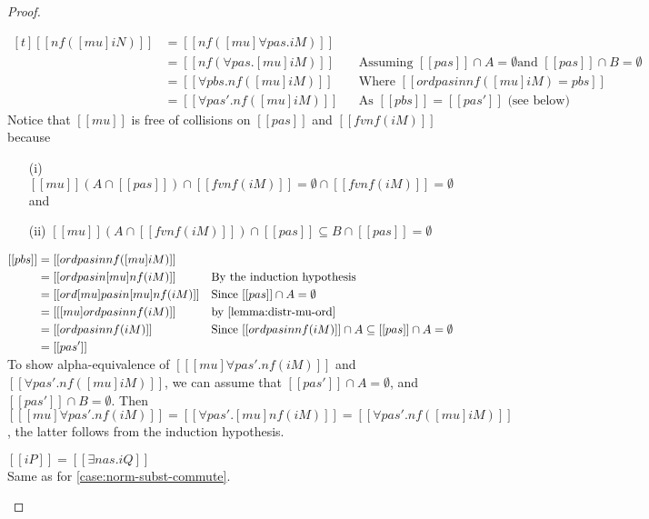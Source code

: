 \begin{proof}
\begin{caseof}
      $\begin{aligned}[t]
         [[ nf([mu]iN) ]] &= [[ nf([mu] ∀pas.iM)]] \\
                          &= [[ nf(∀pas.[mu]iM) ]]
                          && \text{Assuming $[[{pas}]] \cap A = \emptyset$
                             and $[[{pas}]] \cap B = \emptyset$}\\
                          &= [[ ∀pbs.nf([mu]iM) ]]
                          && \text {Where $[[ ord {pas} in nf([mu]iM) = pbs ]]$}\\
                          &= [[ ∀pas'.nf([mu]iM) ]]
                          && \text {As $[[pbs]] = [[pas']]$ (see below)}
         \end{aligned}$ \\

    Notice that $[[mu]]$ is free of collisions on $[[{pas}]]$ and $[[fv nf(iM)]]$ because
    \begin{enumerate}[nolistsep]
      \item[(i)] $[[mu]](A \cap [[{pas}]]) \cap [[fv nf(iM)]] = \emptyset \cap [[fv nf(iM)]] = \emptyset$ and
      \item[(ii)] $[[mu]](A \cap [[fv nf(iM)]]) \cap [[{pas}]] \subseteq B \cap
        [[{pas}]] = \emptyset$
    \end{enumerate}
    $\begin{aligned}[t]
       [[pbs]] &= [[ ord {pas} in nf([mu]iM) ]] \\
               &= [[ ord {pas} in [mu]nf(iM) ]]
               && \text{By the induction hypothesis} \\
               &= [[ ord {[mu]pas} in [mu]nf(iM) ]]
               && \text{Since $[[{pas}]] \cap A = \emptyset$} \\
               &= [[ [mu] ord {pas} in nf(iM) ]]
               && \text{by \cref{lemma:distr-mu-ord}} \\
               &= [[ ord {pas} in nf(iM) ]]
               && \text{Since $[[{ord {pas} in nf(iM)}]] \cap A \subseteq [[{pas}]] \cap A = \emptyset$} \\
               &= [[ pas' ]]
     \end{aligned}$ \\

     To show alpha-equivalence of 
     $[[ [mu] ∀pas'.nf(iM) ]]$ and $[[ ∀pas'.nf([mu]iM) ]]$,
     we can assume that $[[{pas'}]] \cap A = \emptyset$, and $[[{pas'}]] \cap B = \emptyset$.
     Then $[[ [mu] ∀pas'.nf(iM) ]] = [[∀pas'.[mu]nf(iM)]] = [[ ∀pas'.nf([mu]iM)
     ]]$, the latter follows from the induction hypothesis.

   \item $[[iP]] = [[∃ nas.iQ]]$ \\
     Same as for \cref{case:norm-subst-commute}.
  \end{caseof}
\end{proof}

